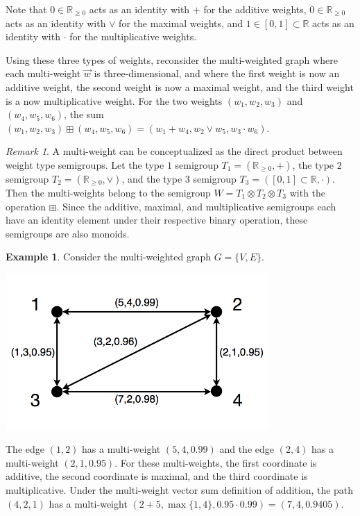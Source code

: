 \documentclass[12pt]{amsart}
\theoremstyle{definition}
\newtheorem{example}[thm]{Example}
\theoremstyle{remark}
\newtheorem{remark}[thm]{Remark}
\numberwithin{equation}{section}
\newcommand{\R}{\mathbb{R}}
\begin{document}
Note that $0 \in \R_{\ge 0}$ acts as an identity with $+$ for the additive weights, $0 \in \R_{\ge 0}$ acts as an identity with $\vee$ for the maximal weights, and $1 \in [0,1] \subset \R$ acts as an identity with $\cdot$ for the multiplicative weights.

Using these three types of weights, reconsider the multi-weighted graph where each multi-weight $\vec{w}$ is three-dimensional, and where the first weight is now an additive weight, the second weight is now a maximal weight, and the third weight is a now multiplicative weight. For the two weights $(w_1, w_2, w_3)$ and $(w_4, w_5, w_6)$, the sum $(w_1, w_2, w_3) \boxplus (w_4, w_5, w_6) = (w_1 + w_4, w_2 \vee w_5, w_3 \cdot w_6)$.

\begin{remark}
A multi-weight can be conceptualized as the direct product between weight type semigroups. Let the type $1$ semigroup $T_1 = (\R_{\ge 0}, +)$, the type $2$ semigroup $T_2 = (\R_{\ge 0}, \vee)$, and the type $3$ semigroup $T_3 = ([0,1] \subset \R, \cdot)$. Then the multi-weights belong to the semigroup $W = T_1 \otimes T_2 \otimes T_3$ with the operation $\boxplus$. Since the additive, maximal, and multiplicative semigroups each have an identity element under their respective binary operation, these semigroups are also monoids.
\end{remark}

\begin{example} Consider the multi-weighted graph $G = \{V,E\}$.

\begin{center}\includegraphics[width=10cm]{figure-4-5-6.png}\end{center}

The edge $(1,2)$ has a multi-weight $(5, 4, 0.99)$ and the edge $(2,4)$ has a multi-weight $(2,1,0.95)$. For these multi-weights, the first coordinate is additive, the second coordinate is maximal, and the third coordinate is multiplicative. Under the multi-weight vector sum definition of addition, the path $(4,2,1)$ has a multi-weight $(2+5, \max\{1,4\}, 0.95 \cdot 0.99) = (7, 4, 0.9405)$.
\end{example}
\end{document}

